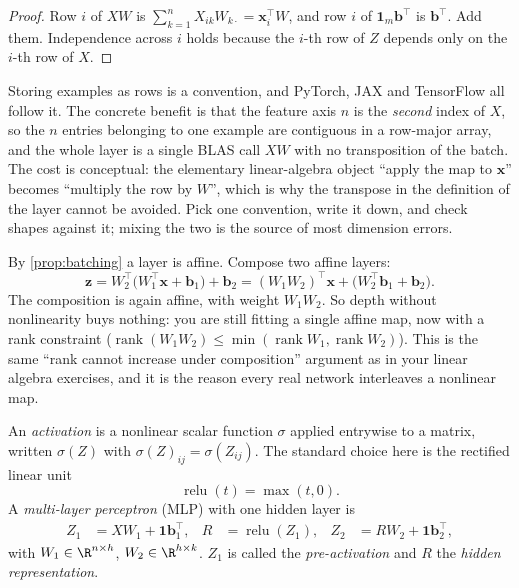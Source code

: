 \begin{proof}
Row $i$ of $XW$ is $\sum_{k=1}^{n}X_{ik}W_{k\cdot}=\mathbf{x}_i^{\!\top}W$, and
row $i$ of $\mathbf{1}_m\mathbf{b}^{\!\top}$ is $\mathbf{b}^{\!\top}$. Add them.
Independence across $i$ holds because the $i$-th row of $Z$ depends only on the
$i$-th row of $X$.
\end{proof}

\begin{remark}
Storing examples as rows is a convention, and PyTorch, JAX and TensorFlow all
follow it. The concrete benefit is that the feature axis $n$ is the
\emph{second} index of $X$, so the $n$ entries belonging to one example are
contiguous in a row-major array, and the whole layer is a single BLAS call
$XW$ with no transposition of the batch. The cost is conceptual: the elementary
linear-algebra object ``apply the map to $\mathbf{x}$'' becomes ``multiply the
row by $W$'', which is why the transpose in the definition of the layer cannot
be avoided. Pick one convention, write it down, and check shapes against it;
mixing the two is the source of most dimension errors.
\end{remark}

\begin{remark}
By \cref{prop:batching} a layer is affine. Compose two affine layers:
\[
  \mathbf{z}=W_2^{\!\top}\bigl(W_1^{\!\top}\mathbf{x}+\mathbf{b}_1\bigr)+\mathbf{b}_2
  =(W_1W_2)^{\!\top}\mathbf{x}+\bigl(W_2^{\!\top}\mathbf{b}_1+\mathbf{b}_2\bigr).
\]
The composition is again affine, with weight $W_1W_2$. So depth without
nonlinearity buys nothing: you are still fitting a single affine map, now with
a rank constraint ($\operatorname{rank}(W_1W_2)\le\min(\operatorname{rank}W_1,\operatorname{rank}W_2)$).
This is the same ``rank cannot increase under composition'' argument as in your
linear algebra exercises, and it is the reason every real network interleaves
a nonlinear map.
\end{remark}

\begin{definition}
An \emph{activation} is a nonlinear scalar function $\sigma$ applied entrywise
to a matrix, written $\sigma(Z)$ with $\sigma(Z)_{ij}=\sigma(Z_{ij})$. The
standard choice here is the rectified linear unit
\[
  \operatorname{relu}(t)=\max(t,0).
\]
A \emph{multi-layer perceptron} (MLP) with one hidden layer is
\begin{align*}
  Z_1&=XW_1+\mathbf{1}\mathbf{b}_1^{\!\top}, &
  R&=\operatorname{relu}(Z_1), &
  Z_2&=RW_2+\mathbf{1}\mathbf{b}_2^{\!\top},
\end{align*}
with $W_1\in\R^{n\times h}$, $W_2\in\R^{h\times k}$. $Z_1$ is called the
\emph{pre-activation} and $R$ the \emph{hidden representation}.
\end{definition}

